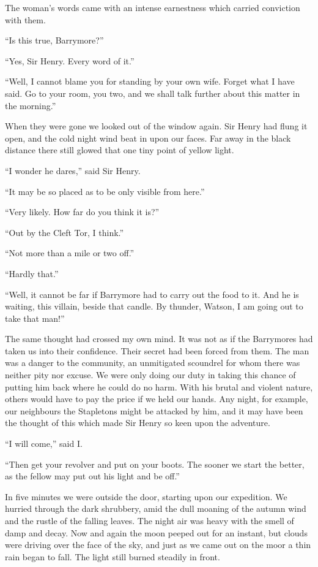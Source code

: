 \documentclass[paper=5.5in:8.5in,BCOR=7mm,twoside,DIV=calc,12pt,usegeometry,openany,chapterprefix,endperiod,headings=big]{scrbook} %
\begin{document}
The woman's words came with an intense earnestness which carried conviction with them.

\enquote{Is this true, Barrymore?}

\enquote{Yes, Sir Henry. Every word of it.}

\enquote{Well, I cannot blame you for standing by your own wife. Forget what I have said. Go to your room, you two, and we shall talk further about this matter in the morning.}

When they were gone we looked out of the window again. Sir Henry had flung it open, and the cold night wind beat in upon our faces. Far away in the black distance there still glowed that one tiny point of yellow light.

\enquote{I wonder he dares,} said Sir Henry.

\enquote{It may be so placed as to be only visible from here.}

\enquote{Very likely. How far do you think it is?}

\enquote{Out by the Cleft Tor, I think.}

\enquote{Not more than a mile or two off.}

\enquote{Hardly that.}

\enquote{Well, it cannot be far if Barrymore had to carry out the food to it. And he is waiting, this villain, beside that candle. By thunder, Watson, I am going out to take that man!}

The same thought had crossed my own mind. It was not as if the Barrymores had taken us into their confidence. Their secret had been forced from them. The man was a danger to the community, an unmitigated scoundrel for whom there was neither pity nor excuse. We were only doing our duty in taking this chance of putting him back where he could do no harm. With his brutal and violent nature, others would have to pay the price if we held our hands. Any night, for example, our neighbours the Stapletons might be attacked by him, and it may have been the thought of this which made Sir Henry so keen upon the adventure.

\enquote{I will come,} said I.

\enquote{Then get your revolver and put on your boots. The sooner we start the better, as the fellow may put out his light and be off.}

In five minutes we were outside the door, starting upon our expedition. We hurried through the dark shrubbery, amid the dull moaning of the autumn wind and the rustle of the falling leaves. The night air was heavy with the smell of damp and decay. Now and again the moon peeped out for an instant, but clouds were driving over the face of the sky, and just as we came out on the moor a thin rain began to fall. The light still burned steadily in front.
\end{document}
